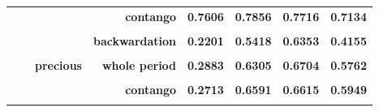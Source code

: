 \documentclass[
  authoryear,
  preprint,
  3p]{elsarticle}
\begin{document}
\begin{longtable}[t]{>{}l>{}l>{}l>{}r>{}r>{}r>{}r>{}r}
\textbf{} & \textbf{} & \textbf{} & \textbf{contango} & \textcolor[HTML]{4285f4}{\textbf{0.7606}} & \textcolor[HTML]{4285f4}{\textbf{0.7856}} & \textcolor[HTML]{4285f4}{\textbf{0.7716}} & \textcolor[HTML]{4285f4}{\textbf{0.7134}}\\
\textbf{\cellcolor{gray!10}{}} & \textbf{\cellcolor{gray!10}{metals}} & \textbf{\cellcolor{gray!10}{all}} & \textbf{\cellcolor{gray!10}{whole period}} & \textcolor[HTML]{4285f4}{\textbf{\cellcolor{gray!10}{0.2167}}} & \textcolor[HTML]{4285f4}{\textbf{\cellcolor{gray!10}{0.5553}}} & \textcolor[HTML]{4285f4}{\textbf{\cellcolor{gray!10}{0.5877}}} & \textcolor[HTML]{4285f4}{\textbf{\cellcolor{gray!10}{0.4721}}}\\
\addlinespace
\textbf{} & \textbf{} & \textbf{} & \textbf{backwardation} & \textcolor[HTML]{4285f4}{\textbf{0.2201}} & \textcolor[HTML]{4285f4}{\textbf{0.5418}} & \textcolor[HTML]{4285f4}{\textbf{0.6353}} & \textcolor[HTML]{4285f4}{\textbf{0.4155}}\\
\textbf{\cellcolor{gray!10}{}} & \textbf{\cellcolor{gray!10}{}} & \textbf{\cellcolor{gray!10}{}} & \textbf{\cellcolor{gray!10}{contango}} & \textcolor[HTML]{4285f4}{\textbf{\cellcolor{gray!10}{0.2145}}} & \textcolor[HTML]{4285f4}{\textbf{\cellcolor{gray!10}{0.5727}}} & \textcolor[HTML]{4285f4}{\textbf{\cellcolor{gray!10}{0.5709}}} & \textcolor[HTML]{4285f4}{\textbf{\cellcolor{gray!10}{0.5035}}}\\
\textbf{} & \textbf{} & \textbf{precious} & \textbf{whole period} & \textcolor[HTML]{4285f4}{\textbf{0.2883}} & \textcolor[HTML]{4285f4}{\textbf{0.6305}} & \textcolor[HTML]{4285f4}{\textbf{0.6704}} & \textcolor[HTML]{4285f4}{\textbf{0.5762}}\\
\textbf{\cellcolor{gray!10}{}} & \textbf{\cellcolor{gray!10}{}} & \textbf{\cellcolor{gray!10}{}} & \textbf{\cellcolor{gray!10}{backwardation}} & \textcolor[HTML]{4285f4}{\textbf{\cellcolor{gray!10}{0.3070}}} & \textcolor[HTML]{4285f4}{\textbf{\cellcolor{gray!10}{0.6061}}} & \textcolor[HTML]{4285f4}{\textbf{\cellcolor{gray!10}{0.6991}}} & \textcolor[HTML]{4285f4}{\textbf{\cellcolor{gray!10}{0.5386}}}\\
\textbf{} & \textbf{} & \textbf{} & \textbf{contango} & \textcolor[HTML]{4285f4}{\textbf{0.2713}} & \textcolor[HTML]{4285f4}{\textbf{0.6591}} & \textcolor[HTML]{4285f4}{\textbf{0.6615}} & \textcolor[HTML]{4285f4}{\textbf{0.5949}}\\
\addlinespace
\textbf{\cellcolor{gray!10}{GB}} & \textbf{\cellcolor{gray!10}{all}} & \textbf{\cellcolor{gray!10}{all}} & \textbf{\cellcolor{gray!10}{whole period}} & \textcolor[HTML]{4285f4}{\textbf{\cellcolor{gray!10}{0.4047}}} & \textcolor[HTML]{4285f4}{\textbf{\cellcolor{gray!10}{0.4691}}} & \textcolor[HTML]{4285f4}{\textbf{\cellcolor{gray!10}{0.6536}}} & \textcolor[HTML]{4285f4}{\textbf{\cellcolor{gray!10}{0.4412}}}\\

\end{longtable}
\end{document}
